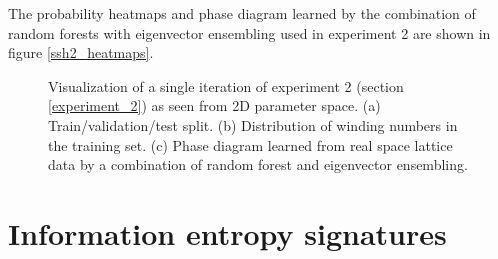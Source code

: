 \documentclass[10pt]{revtex4-1}
\begin{document}
The probability heatmaps and phase diagram learned by the combination of random forests with eigenvector ensembling used in experiment 2 are shown in figure \ref{ssh2_heatmaps}.

\begin{figure}
\centering
{}\quad
{}
\caption{Visualization of a single iteration of experiment 2 (section \ref{experiment_2}) as seen from 2D parameter space. (a) Train/validation/test split. (b) Distribution of winding numbers in the training set. (c) Phase diagram learned from real space lattice data by a combination of random forest and eigenvector ensembling.}
\label{figexp2_exp}
\end{figure}

\section{Information entropy signatures}
\label{information_entropy_signatures}
\end{document}
